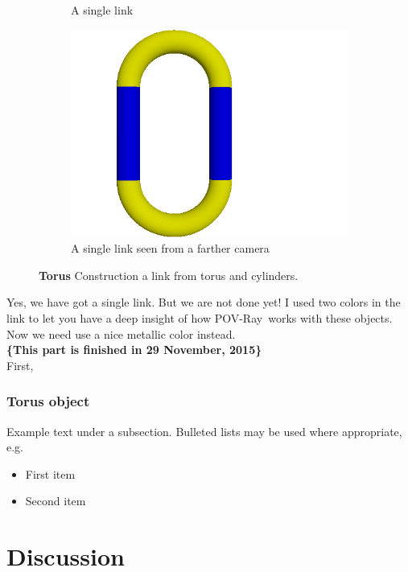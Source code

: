 \documentclass[fleqn,10pt]{wlscirep}
\newcommand*{\PV}{POV-Ray}
\begin{document}
\begin{figure}
\begin{subfigure}{0.31\textwidth}
\caption{A single link} \label{fig:FIG10b}
\end{subfigure}
\hspace*{\fill} %
\begin{subfigure}{0.31\textwidth}
\includegraphics[width=\linewidth]{FIG10c}
\caption{A single link seen from a farther camera} \label{fig:FIG10c}
\end{subfigure}
\caption{\textbf{Torus} Construction a link from torus and cylinders.} \label{}
\end{figure}
Yes, we have got a single link. But we are not done yet! I used two colors in the link to let you have a deep insight of how \PV~works with these objects. Now we need use a nice metallic color instead. \\
\textbf{\{This part is finished in  29 November, 2015\}}\\
First,


\subsubsection*{Torus object}


Example text under a subsection. Bulleted lists may be used where appropriate, e.g.

\begin{itemize}
\item First item
\item Second item
\end{itemize}

\section*{Discussion}
\end{document}
